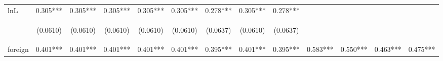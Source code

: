 \begin{center}
\begin{tabular}{lcccccccccccc}
lnL & 0.305*** & 0.305*** & 0.305*** & 0.305*** & 0.305*** & 0.278*** & 0.305*** & 0.278*** &  &  &  &  \\
\vspace{4pt} & \begin{footnotesize}(0.0610)\end{footnotesize} & \begin{footnotesize}(0.0610)\end{footnotesize} & \begin{footnotesize}(0.0610)\end{footnotesize} & \begin{footnotesize}(0.0610)\end{footnotesize} & \begin{footnotesize}(0.0610)\end{footnotesize} & \begin{footnotesize}(0.0637)\end{footnotesize} & \begin{footnotesize}(0.0610)\end{footnotesize} & \begin{footnotesize}(0.0637)\end{footnotesize} & \begin{footnotesize}\end{footnotesize} & \begin{footnotesize}\end{footnotesize} & \begin{footnotesize}\end{footnotesize} & \begin{footnotesize}\end{footnotesize} \\
foreign & 0.401*** & 0.401*** & 0.401*** & 0.401*** & 0.401*** & 0.395*** & 0.401*** & 0.395*** & 0.583*** & 0.550*** & 0.463*** & 0.475*** \\

\end{tabular}
\end{center}
